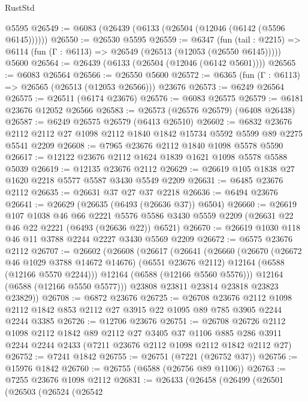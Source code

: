 \begin{lexlean}{RustStd}
\begin{coremodule}
    @5595
@26549 := @6083 (@26439 (@6133 (@26504 (@12046 (@6142 (@5596 @6145))))))
@26550 := @26530 @5595
@26559 := @6347
    (fun (tail : @2215) => @6114 (fun (Γ : @6113) => @26549 (@26513 (@12053 (@26550 @6145)))))
    @5600
@26564 := @26439 (@6133 (@26504 (@12046 (@6142 @5601))))
@26565 := @6083 @26564
@26566 := @26550 @5600
@26572 := @6365 (fun (Γ : @6113) => @26565 (@26513 (@12053 @26566))) @23676
@26573 := @6249 @26564
@26575 := @26511 (@6174 @23676)
@26576 := @6083 @26575
@26579 := @6181 @23676 @12052 @26566
@26583 := @26573 (@26576 @26579) (@6408 @26438)
@26587 := @6249 @26575 @26579 (@6413 @26510)
@26602 := @6832
    @23676
    @2112
    @2112
    @27
    @1098
    @2112
    @1840
    @1842
    @15734
    @5592
    @5599
    @89
    @2275
    @5541
    @2209
@26608 := @7965 @23676 @2112 @1840 @1098 @5578 @5590
@26617 := @12122 @23676 @2112 @1624 @1839 @1621 @1098 @5578 @5588 @5039
@26619 := @12135 @23676 @2112
@26629 := @26619 @105 @1838 @27 @1620 @2218 @5577 @5587 @3430 @5549 @2209
@26631 := @6485 @23676 @2112
@26635 := @26631 @37 @27 @37 @2218
@26636 := @6494 @23676
@26641 := @26629 (@26635 (@6493 (@26636 @37)) @6504)
@26660 := @26619
    @107
    @1038
    @46
    @66
    @2221
    @5576
    @5586
    @3430
    @5559
    @2209
    (@26631 @22 @46 @22 @2221 (@6493 (@26636 @22)) @6521)
@26670 := @26619 @1030 @118 @46 @11 @3788 @2244 @2227 @3430 @5569 @2209
@26672 := @6575 @23676 @2112
@26707 := @26602
    (@26608
      (@26617
        (@26641
          (@26660
            (@26670
              (@26672 @46 @1029 @3788 @14672 @14676)
              (@6551 @23676 @2112)
              @12164
              (@6588 (@12166 @5570 @2244)))
            @12164
            (@6588 (@12166 @5560 @5576)))
          @12164
          (@6588 (@12166 @5550 @5577)))
        @23808
        @23811
        @23814
        @23818
        @23823
        @23829))
@26708 := @6872 @23676
@26725 := @26708
    @23676
    @2112
    @1098
    @2112
    @1842
    @853
    @2112
    @27
    @3915
    @22
    @1095
    @89
    @785
    @3905
    @2244
    @2244
    @3385
@26726 := @12706 @23676
@26751 := @26708
    @26726
    @2112
    @1098
    @2112
    @1842
    @89
    @2112
    @27
    @3405
    @37
    @1106
    @885
    @286
    @3911
    @2244
    @2244
    @2433
    (@7211 @23676 @2112 @1098 @2112 @1842 @2112 @27)
@26752 := @7241 @1842
@26755 := @26751 (@7221 (@26752 @37))
@26756 := @15976 @1842
@26760 := @26755 (@6588 (@26756 @89 @1106))
@26763 := @7255 @23676 @1098 @2112
@26831 := @26433
    (@26458
      (@26499
        (@26501
          (@26503
            (@26524
              (@26542

\end{coremodule}
\end{lexlean}
